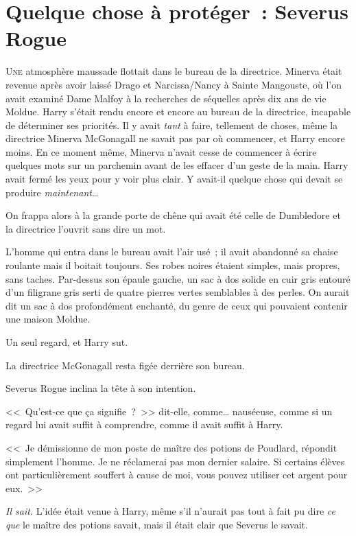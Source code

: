 \chapter{Quelque chose à protéger~: Severus Rogue}

\lettrine{U}{ne} atmosphère maussade flottait dans le bureau de la directrice. Minerva était revenue après avoir laissé Drago et Narcissa/Nancy à Sainte Mangouste, où l'on avait examiné Dame Malfoy à la recherches de séquelles après dix ans de vie Moldue. Harry s'était rendu encore et encore au bureau de la directrice, incapable de déterminer ses priorités. Il y avait \emph{tant} à faire, tellement de choses, même la directrice Minerva McGonagall ne savait pas par où commencer, et Harry encore moins. En ce moment même, Minerva n'avait cesse de commencer à écrire quelques mots sur un parchemin avant de les effacer d'un geste de la main. Harry avait fermé les yeux pour y voir plus clair. Y avait-il quelque chose qui devait se produire \emph{maintenant}…

On frappa alors à la grande porte de chêne qui avait été celle de Dumbledore et la directrice l'ouvrit sans dire un mot.

L'homme qui entra dans le bureau avait l'air usé~; il avait abandonné sa chaise roulante mais il boitait toujours. Ses robes noires étaient simples, mais propres, sans taches. Par-dessus son épaule gauche, un sac à dos solide en cuir gris entouré d'un filigrane gris serti de quatre pierres vertes semblables à des perles. On aurait dit un sac à dos profondément enchanté, du genre de ceux qui pouvaient contenir une maison Moldue.

Un seul regard, et Harry sut.

La directrice McGonagall resta figée derrière son bureau.

Severus Rogue inclina la tête à son intention.

<<~Qu'est-ce que ça signifie~?~>> dit-elle, comme… nauséeuse, comme si un regard lui avait suffit à comprendre, comme il avait suffit à Harry.

<<~Je démissionne de mon poste de maître des potions de Poudlard, répondit simplement l'homme. Je ne réclamerai pas mon dernier salaire. Si certains élèves ont particulièrement souffert à cause de moi, vous pouvez utiliser cet argent pour eux.~>>

\emph{Il sait.} L'idée était venue à Harry, même s'il n'aurait pas tout à fait pu dire \emph{ce que} le maître des potions savait, mais il était clair que Severus le savait.

